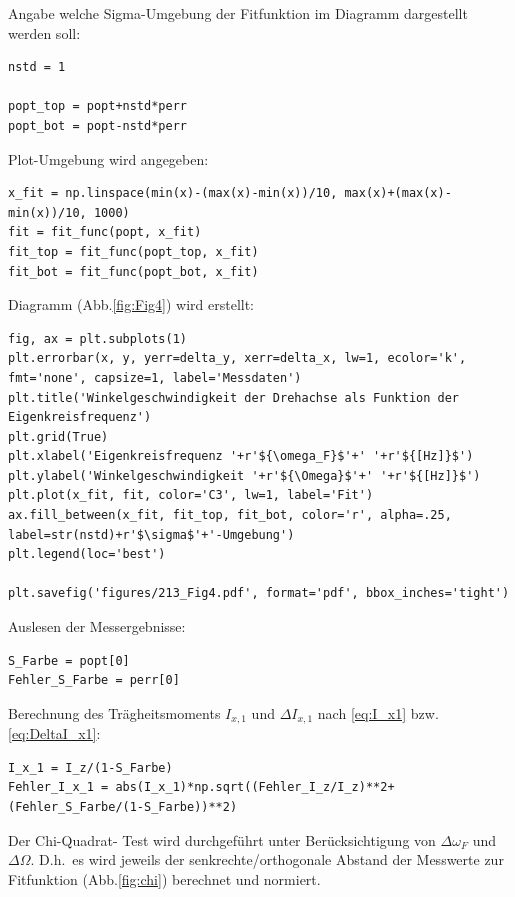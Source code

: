 \documentclass[a4paper,10pt]{article}
\begin{document}
Angabe welche Sigma-Umgebung der Fitfunktion im Diagramm dargestellt werden soll:\begin{lstlisting}
nstd = 1 

popt_top = popt+nstd*perr
popt_bot = popt-nstd*perr

\end{lstlisting}

Plot-Umgebung wird angegeben:\begin{lstlisting}
x_fit = np.linspace(min(x)-(max(x)-min(x))/10, max(x)+(max(x)-min(x))/10, 1000)
fit = fit_func(popt, x_fit)
fit_top = fit_func(popt_top, x_fit)
fit_bot = fit_func(popt_bot, x_fit)

\end{lstlisting}

Diagramm (Abb.\ref{fig:Fig4}) wird erstellt:\begin{lstlisting}
fig, ax = plt.subplots(1)
plt.errorbar(x, y, yerr=delta_y, xerr=delta_x, lw=1, ecolor='k', fmt='none', capsize=1, label='Messdaten')
plt.title('Winkelgeschwindigkeit der Drehachse als Funktion der Eigenkreisfrequenz')
plt.grid(True)
plt.xlabel('Eigenkreisfrequenz '+r'${\omega_F}$'+' '+r'${[Hz]}$')
plt.ylabel('Winkelgeschwindigkeit '+r'${\Omega}$'+' '+r'${[Hz]}$')
plt.plot(x_fit, fit, color='C3', lw=1, label='Fit')
ax.fill_between(x_fit, fit_top, fit_bot, color='r', alpha=.25, label=str(nstd)+r'$\sigma$'+'-Umgebung')
plt.legend(loc='best')

plt.savefig('figures/213_Fig4.pdf', format='pdf', bbox_inches='tight')

\end{lstlisting}

Auslesen der Messergebnisse:\begin{lstlisting}
S_Farbe = popt[0]
Fehler_S_Farbe = perr[0]

\end{lstlisting}

Berechnung des Trägheitsmoments \(I_{x,1}\) und \(\Delta I_{x,1}\) nach \eqref{eq:I_x1} bzw. \eqref{eq:DeltaI_x1}:\begin{lstlisting}
I_x_1 = I_z/(1-S_Farbe)
Fehler_I_x_1 = abs(I_x_1)*np.sqrt((Fehler_I_z/I_z)**2+(Fehler_S_Farbe/(1-S_Farbe))**2)

\end{lstlisting}
Der Chi-Quadrat-
Test wird durchgeführt unter Berücksichtigung von \(\Delta \omega_F\) und \(\Delta \Omega\). D.h.~es wird jeweils der senkrechte/orthogonale Abstand der Messwerte zur Fitfunktion (Abb.\ref{fig:chi}) berechnet und normiert\fnrefa.
\end{document}
